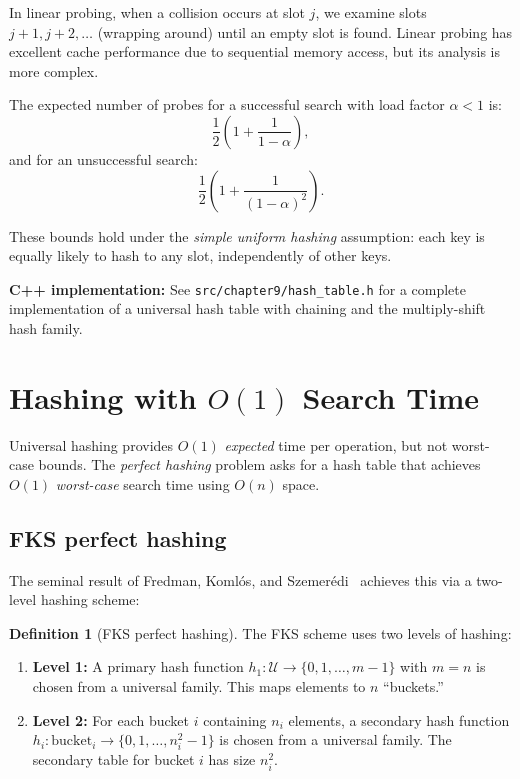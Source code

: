 \documentclass[twoside,12pt]{book}
\theoremstyle{plain}
\theoremstyle{definition}
\newtheorem{definition}[theorem]{Definition}
\theoremstyle{remark}
\newenvironment{cpplisting}{\begin{center}\small}{\end{center}}
\begin{document}
In linear probing, when a collision occurs at slot $j$, we examine slots $j+1, j+2, \ldots$ (wrapping around) until an empty slot is found. Linear probing has excellent cache performance due to sequential memory access, but its analysis is more complex.

The expected number of probes for a successful search with load factor $\alpha < 1$ is:
\[
\frac{1}{2}\left(1 + \frac{1}{1-\alpha}\right),
\]
and for an unsuccessful search:
\[
\frac{1}{2}\left(1 + \frac{1}{(1-\alpha)^2}\right).
\]

These bounds hold under the \emph{simple uniform hashing} assumption: each key is equally likely to hash to any slot, independently of other keys.

\begin{cpplisting}
\textbf{C++ implementation:} See \texttt{src/chapter9/hash\_table.h} for a complete
implementation of a universal hash table with chaining and the multiply-shift hash family.
\end{cpplisting}

\section{Hashing with \texorpdfstring{$O(1)$}{O(1)} Search Time}
\label{sec:perfect-hashing}

Universal hashing provides $O(1)$ \emph{expected} time per operation, but not worst-case bounds. The \emph{perfect hashing} problem asks for a hash table that achieves $O(1)$ \emph{worst-case} search time using $O(n)$ space.

\subsection{FKS perfect hashing}

The seminal result of Fredman, Koml\'{o}s, and Szemer\'{e}di~\cite{fredman1984} achieves this via a two-level hashing scheme:

\begin{definition}[FKS perfect hashing]
The FKS scheme uses two levels of hashing:
\begin{enumerate}[nosep]
    \item \textbf{Level 1:} A primary hash function $h_1: \mathcal{U} \to \{0, 1, \ldots, m-1\}$ with $m = n$ is chosen from a universal family. This maps elements to $n$ ``buckets.''
    \item \textbf{Level 2:} For each bucket $i$ containing $n_i$ elements, a secondary hash function $h_i: \text{bucket}_i \to \{0, 1, \ldots, n_i^2 - 1\}$ is chosen from a universal family. The secondary table for bucket $i$ has size $n_i^2$.
\end{enumerate}
\end{definition}
\end{document}
